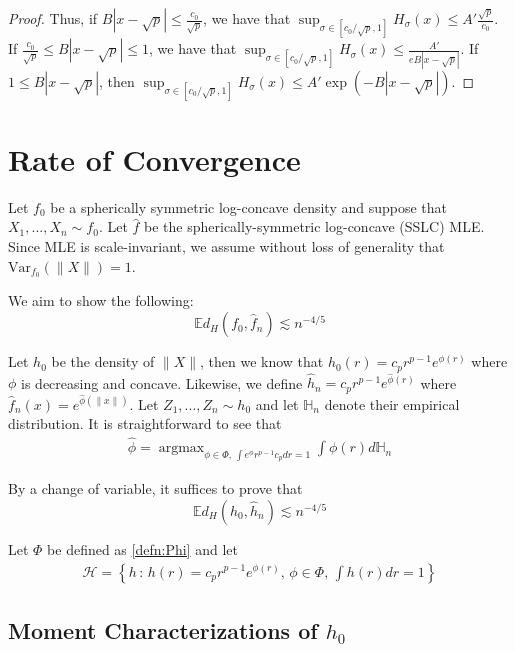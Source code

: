 \documentclass[12pt]{article}
\DeclareMathOperator*{\argmax}{argmax}
\begin{document}
\begin{proof}
Thus, if $B| x - \sqrt{p}| \leq \frac{c_0}{\sqrt{p}}$, we have that $\sup_{\sigma \in [c_0/\sqrt{p}, 1]} H_{\sigma}(x) \leq A' \frac{\sqrt{p} }{c_0}$. 
If $\frac{c_0}{\sqrt{p}} \leq B | x - \sqrt{p} | \leq 1$, we have that $\sup_{\sigma \in [c_0/\sqrt{p}, 1]} H_{\sigma}(x) \leq \frac{A'}{e B | x - \sqrt{p} | }$. 
If  $1 \leq B | x - \sqrt{p} |$, then $\sup_{\sigma \in [c_0/\sqrt{p}, 1]} H_{\sigma} (x) \leq A' \exp( - B | x - \sqrt{p}|)$. 

\end{proof}


\section{Rate of Convergence}

Let $f_0$ be a spherically symmetric log-concave density and suppose that $X_1, ..., X_n \sim f_0$. Let $\hat{f}$ be the spherically-symmetric log-concave (SSLC) MLE. Since MLE is scale-invariant, we assume without loss of generality that $\textrm{Var}_{f_0} (\| X \|) = 1$.

We aim to show the following:
\[
  \mathbb{E} d_H(f_0, \hat{f}_n) \lesssim n^{-4/5}
\]

Let $h_0$ be the density of $\| X \|$, then we know that $h_0(r) = c_p r^{p-1} e^{\phi(r)}$ where $\phi$ is decreasing and concave. Likewise, we define $\hat{h}_n = c_p r^{p-1} e^{\hat{\phi}(r)}$ where $\hat{f}_n(x) = e^{\hat{\phi}(\| x \|)} $. Let $Z_1,...,Z_n \sim h_0$ and let $\mathbb{H}_n$ denote their empirical distribution. It is straightforward to see that
\begin{align}
  \hat{\phi} = \argmax_{\phi \in \Phi,\, \int e^{\phi} r^{p-1} c_p dr = 1} \int \phi(r) d \mathbb{H}_n  \label{eqn:hMLE}
\end{align}

By a change of variable, it suffices to prove that
\[
  \mathbb{E} d_H(h_0, \hat{h}_n) \lesssim n^{-4/5}
\]

Let $\Phi$ be defined as \ref{defn:Phi} and let
\begin{align}
  \mathcal{H} = \left\{ h \,:\, h(r) = c_p r^{p-1} e^{\phi(r)},\, \phi \in \Phi,\, \int h(r) dr = 1 \right \}
  \label{eqn:H_class}
\end{align}


\subsection{Moment Characterizations of $h_0$}
\end{document}
